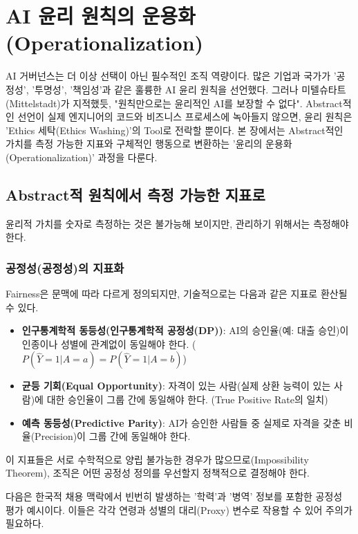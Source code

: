 \chapter{AI 윤리 원칙의 운용화(Operationalization)}

AI 거버넌스는 더 이상 선택이 아닌 필수적인 조직 역량이다. 많은 기업과 국가가 '공정성', '투명성', '책임성'과 같은 훌륭한 AI 윤리 원칙을 선언했다. 그러나 미텔슈타트(Mittelstadt)가 지적했듯, "원칙만으로는 윤리적인 AI를 보장할 수 없다"\cite{mittelstadt2019principles}. Abstract적인 선언이 실제 엔지니어의 코드와 비즈니스 프로세스에 녹아들지 않으면, 윤리 원칙은 'Ethics 세탁(Ethics Washing\cite{rakova2021responsible})'의 Tool로 전락할 뿐이다.\cite{hagendorff2020ethics} 본 장에서는 Abstract적인 가치를 측정 가능한 지표와 구체적인 행동으로 변환하는 '윤리의 운용화(Operationalization)' 과정을 다룬다.\cite{morley2020from, zhu2022ai}

\section{Abstract적 원칙에서 측정 가능한 지표로}

윤리적 가치를 숫자로 측정하는 것은 불가능해 보이지만, 관리하기 위해서는 측정해야 한다.

\subsection{공정성(공정성)의 지표화}
Fairness은 문맥에 따라 다르게 정의되지만\cite{mehrabi2021survey, binns2018fairness}, 기술적으로는 다음과 같은 지표로 환산될 수 있다.
\begin{itemize}
 \item \textbf{인구통계학적 동등성(인구통계학적 공정성(DP))}: AI의 승인율(예: 대출 승인)이 인종이나 성별에 관계없이 동일해야 한다. ($P(\hat{Y}=1|A=a) = P(\hat{Y}=1|A=b)$)
 \item \textbf{균등 기회(Equal Opportunity)}: 자격이 있는 사람(실제 상환 능력이 있는 사람)에 대한 승인율이 그룹 간에 동일해야 한다. (True Positive Rate의 일치)
 \item \textbf{예측 동등성(Predictive Parity)}: AI가 승인한 사람들 중 실제로 자격을 갖춘 비율(Precision)이 그룹 간에 동일해야 한다.
\end{itemize}
이 지표들은 서로 수학적으로 양립 불가능한 경우가 많으므로(Impossibility Theorem), 조직은 어떤 공정성 정의를 우선할지 정책적으로 결정해야 한다.

다음은 한국적 채용 맥락에서 빈번히 발생하는 '학력'과 '병역' 정보를 포함한 공정성 평가 예시이다. 이들은 각각 연령과 성별의 대리(Proxy) 변수로 작용할 수 있어 주의가 필요하다.

